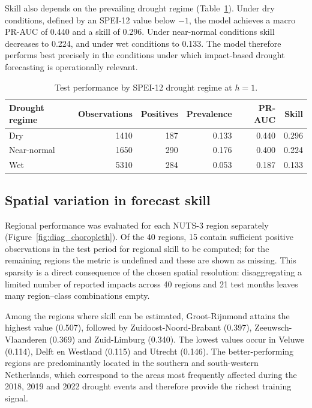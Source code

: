 Skill also depends on the prevailing drought regime
(Table~\ref{tab:drought_bin}). Under dry conditions, defined by an SPEI-12
value below $-1$, the model achieves a macro PR-AUC of 0.440 and a skill of
0.296. Under near-normal conditions skill decreases to 0.224, and under wet
conditions to 0.133. The model therefore performs best precisely in the
conditions under which impact-based drought forecasting is operationally
relevant.

\begin{table}[h]
\centering
\small
\caption{Test performance by SPEI-12 drought regime at $h=1$.}
\label{tab:drought_bin}
\begin{tabular}{lrrrrr}
\toprule
\textbf{Drought regime} & \textbf{Observations} & \textbf{Positives} & \textbf{Prevalence} & \textbf{PR-AUC} & \textbf{Skill} \\
\midrule
Dry         & 1410 & 187 & 0.133 & 0.440 & 0.296 \\
Near-normal & 1650 & 290 & 0.176 & 0.400 & 0.224 \\
Wet         & 5310 & 284 & 0.053 & 0.187 & 0.133 \\
\bottomrule
\end{tabular}
\end{table}

\subsection{Spatial variation in forecast skill}

Regional performance was evaluated for each NUTS-3 region separately
(Figure~\ref{fig:diag_choropleth}). Of the 40 regions, 15 contain sufficient
positive observations in the test period for regional skill to be computed;
for the remaining regions the metric is undefined and these are shown as
missing. This sparsity is a direct consequence of the chosen spatial
resolution: disaggregating a limited number of reported impacts across 40
regions and 21 test months leaves many region--class combinations empty.

Among the regions where skill can be estimated, Groot-Rijnmond attains the
highest value (0.507), followed by Zuidoost-Noord-Brabant (0.397),
Zeeuwsch-Vlaanderen (0.369) and Zuid-Limburg (0.340). The lowest values occur
in Veluwe (0.114), Delft en Westland (0.115) and Utrecht (0.146). The
better-performing regions are predominantly located in the southern and
south-western Netherlands, which correspond to the areas most frequently
affected during the 2018, 2019 and 2022 drought events and therefore provide
the richest training signal.

